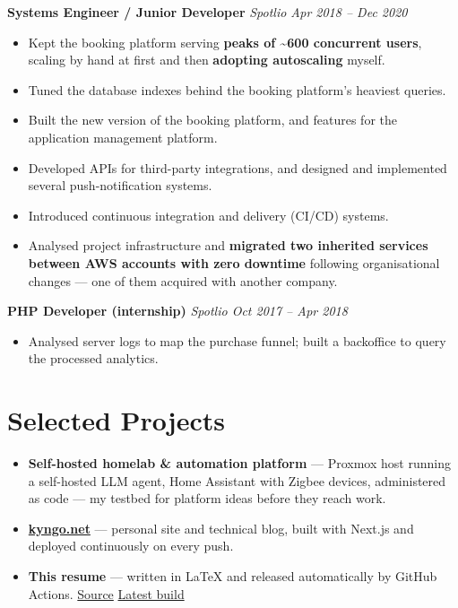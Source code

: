 \documentclass[10pt,a4paper]{article}
\newcommand{\subrole}[2]{%
  \vspace{0.18em}%
  \noindent\hspace{0.8em}\textbf{\small #1} \hfill \textcolor{muted}{\small\textit{#2}}%
  \par\vspace{0.05em}%
}
\begin{document}
\subrole{Systems Engineer / Junior Developer}{Spotlio \textbullet{} Apr 2018 -- Dec 2020}
\begin{itemize}[leftmargin=1.9em]
  \item Kept the booking platform serving \textbf{peaks of \textasciitilde600 concurrent
  users}, scaling by hand at first and then \textbf{adopting autoscaling} myself.
  \item Tuned the database indexes behind the booking platform's heaviest queries.
  \item Built the new version of the booking platform, and features for the application
  management platform.
  \item Developed APIs for third-party integrations, and designed and implemented several
  push-notification systems.
  \item Introduced continuous integration and delivery (CI/CD) systems.
  \item Analysed project infrastructure and \textbf{migrated two inherited services
  between AWS accounts with zero downtime} following organisational changes --- one of
  them acquired with another company.
\end{itemize}

\subrole{PHP Developer (internship)}{Spotlio \textbullet{} Oct 2017 -- Apr 2018}
\begin{itemize}[leftmargin=1.9em]
  \item Analysed server logs to map the purchase funnel; built a backoffice to query the
  processed analytics.
\end{itemize}

\section*{Selected Projects}
\begin{itemize}
  \item \textbf{Self-hosted homelab \& automation platform} --- Proxmox host running a
  self-hosted LLM agent, Home Assistant with Zigbee devices, administered as code --- my
  testbed for platform ideas before they reach work.
  \item \textbf{\href{https://kyngo.net}{kyngo.net}} --- personal site and technical blog,
  built with Next.js and deployed continuously on every push.
  \item \textbf{This resume} --- written in \LaTeX{} and released automatically by GitHub
  Actions. \href{https://github.com/Kyngo/Resume}{Source} \textcolor{muted}{\textbar}
  \href{https://github.com/Kyngo/Resume/releases/latest}{Latest build}
\end{itemize}
\end{document}
